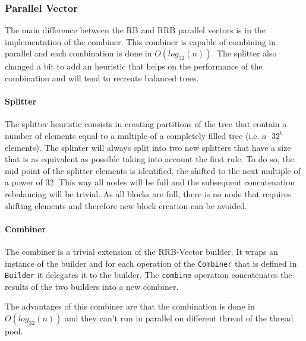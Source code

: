 
\subsubsection{Parallel Vector}
The main difference between the RB and RRB parallel vectors is in the implementation of the combiner. This combiner is capable of combining in parallel and each combination is done in $O(log_{32}(n))$. The splitter also changed a bit to add an heuristic that helps on the performance of the combination and will tend to recreate balanced trees. 

\paragraph{Splitter}
The splitter heuristic consists in creating partitions of the tree that contain a number of elements equal to a multiple of a completely filled tree (i.e. $a \cdot 32^b$ elements). The splinter will always split into two new splitters that have a size that is as equivalent as possible taking into account the first rule. To do so, the mid point of the splitter elements is identified, the shifted to the next multiple of a power of 32. This way all nodes will be full and the subsequent concatenation rebalancing will be trivial. As all blocks are full, there is no node that requires shifting elements and therefore new block creation can be avoided.

\paragraph{Combiner}
The combiner is a trivial extension of the RRB-Vector builder. It wraps an instance of the builder and for each operation of the \texttt{Combiner} that is defined in \texttt{Builder} it delegates it to the builder. The \texttt{combine} operation concatenates the results of the two builders into a new combiner.

The advantages of this combiner are that the combination is done in $O(log_{32}(n))$ and they can't run in parallel on different thread of the thread pool.
